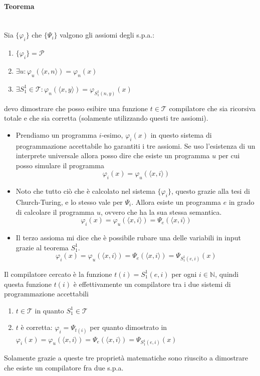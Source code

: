\documentclass{article}
\begin{document}
\paragraph{Teorema}\mbox{}\\
Sia $\{\varphi_i\}$ che $\{\Psi_i\}$ valgono gli assiomi degli s.p.a.:
\begin{enumerate}
    \item $\{\varphi_i\}=\mathcal{P}$
    \item $\exists u:\varphi_u\left(\langle x,n\rangle\right)=\varphi_n(x)$
    \item $\exists S_1^1\in\mathcal{T}:\varphi_n\left(\langle x,y\rangle\right)=\varphi_{S_1^1(n,y)}(x)$
\end{enumerate}
devo dimostrare che posso esibire una funzione $t\in\mathcal{T}$ compilatore
che sia ricorsiva totale e che sia corretta (solamente utilizzando questi tre assiomi).
\begin{itemize}
    \item Prendiamo un programma $i$-esimo, $\varphi_i(x)$ in questo sistema di programmazione
          accettabile ho garantiti i tre assiomi. Se uso l'esistenza di un interprete universale allora
          posso dire che esiste un programma $u$ per cui posso simulare il programma
          $$\varphi_i(x)=\varphi_u\left(\langle x,i\rangle\right)$$
    \item Noto che tutto ciò che è calcolato nel sistema $\{\varphi_i\}$, questo grazie
          alla tesi di Church-Turing, e lo stesso vale per $\Psi_i$. Allora esiste un programma $e$
          in grado di calcolare il programma $u$, ovvero che ha la sua stessa semantica.
          $$\varphi_i(x)=\varphi_u\left(\langle x,i\rangle\right)=\Psi_e\left(\langle x,i\rangle\right)$$
    \item Il terzo assioma mi dice che è possibile rubare una delle variabili in input grazie al
          teorema $S_1^1$.
          $$\varphi_i(x)=\varphi_u\left(\langle x,i\rangle\right)=\Psi_e\left(\langle x,i\rangle\right)=\Psi_{S_1^1(e,i)}(x)$$
\end{itemize}
Il compilatore cercato è la funzione $t(i)=S_1^1(e,i)$ per ogni $i\in\mathbb{N}$, quindi
questa funzione $t(i)$ è effettivamente un compilatore tra i due sistemi di programmazione
accettabili
\begin{enumerate}
    \item $t\in\mathcal{T}$ in quanto $S_1^1\in\mathcal{T}$
    \item $t$ è corretta: $\varphi_i=\Psi_{t(i)}$ per quanto dimostrato in
          $\varphi_i(x)=\varphi_u\left(\langle x,i\rangle\right)=\Psi_e\left(\langle x,i\rangle\right)=\Psi_{S_1^1(e,i)}(x)$
\end{enumerate}
Solamente grazie a queste tre proprietà matematiche sono riuscito a dimostrare che esiste un compilatore
fra due s.p.a.
\end{document}
